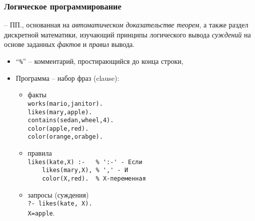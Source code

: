 \documentclass[10pt]{beamer}
\begin{document}
\begin{frame}[fragile]
  \frametitle{Логическое программирование}
  -- ПП., основанная на \emph{автоматическом доказательстве теорем}, а также раздел дискретной математики, изучающий принципы логического вывода \emph{суждений} на основе заданных \emph{фактов} и \emph{правил} вывода.
  \begin{itemize}
  \item ``\verb|%|'' -- комментарий, простирающийся до конца строки,
  \item Программа -- набор фраз (clause):
    \begin{itemize}
    \item факты \\ \verb|works(mario,janitor).|\\\verb|likes(mary,apple).|\\ \verb|contains(sedan,wheel,4).|\\
      \verb|color(apple,red).|\\
      \verb|color(orange,orabge).|
    \item правила \\ \verb|likes(kate,X) :-   % ':-' - Если |\\
      \verb|    likes(mary,X), % ',' - И |\\
      \verb|    color(X,red).  % X-переменная|
    \item запросы (суждения) \\ \verb|?- likes(kate, X).|\\\verb|X=apple|.
    \end{itemize}
  \end{itemize}
\end{frame}
\end{document}
